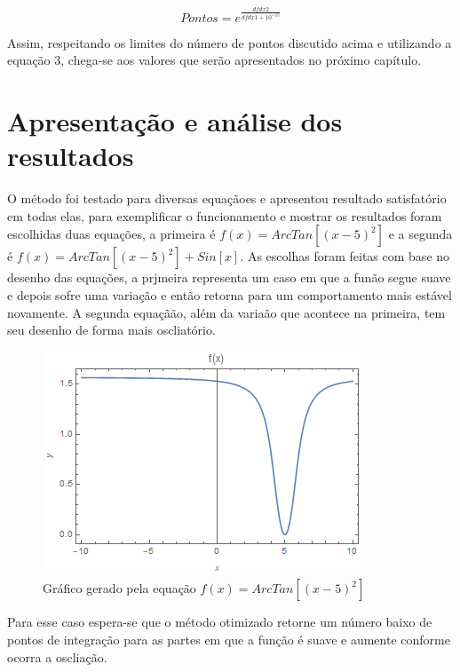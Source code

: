 \documentclass[12pt,a4paper]{article}
\begin{document}
\begin{equation}
Pontos = e^{\frac{dfdx2}{dfdx1+10^{-15}}}
\end{equation}

Assim, respeitando os limites do número de pontos discutido acima e utilizando a equação 3, chega-se aos valores que serão apresentados no próximo capítulo.


\newpage
\section{Apresentação e análise dos resultados}

\qquad O método foi testado para diversas equaçãoes e apresentou resultado satisfatório em todas elas, para exemplificar o funcionamento e mostrar os resultados foram escolhidas duas equações, a primeira é $f(x)=ArcTan[(x-5)^{2}]$ e a segunda é $f(x)=ArcTan[(x-5)^{2}]+Sin[x]$. As escolhas foram feitas com base no desenho das equações, a prjmeira representa um caso em que a funão segue suave e depois sofre uma variação e então retorna para um comportamento mais estável novamente. A segunda equaçãão, além da variaão que acontece na primeira, tem seu desenho de forma mais oscliatório.

\begin{figure}[h]
\begin{center}
\includegraphics{images/funcao_arctang}
\caption{Gráfico gerado pela equação $f(x)=ArcTan[(x-5)^{2}]$}
\end{center}
\end{figure}

Para esse caso espera-se que o método otimizado retorne um número baixo de pontos de integração para as partes em que a função é suave e aumente conforme ocorra a oscliação.

\newpage
\end{document}
